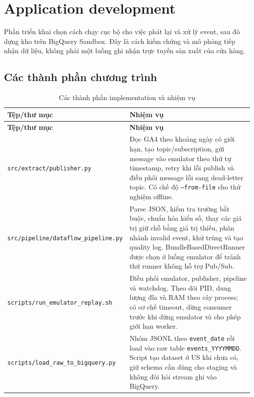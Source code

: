 \section{Application development}
\label{sec:application-development}

Phần triển khai chọn cách chạy cục bộ cho việc phát lại và xử lý event, sau đó dựng kho trên BigQuery Sandbox. Đây là cách kiểm chứng và mô phỏng tiếp nhận dữ liệu, không phải một luồng ghi nhận trực tuyến sản xuất của cửa hàng.

\subsection{Các thành phần chương trình}

\begin{xltabular}{\textwidth}{>{\raggedright\arraybackslash}p{6.3cm} >{\raggedright\arraybackslash}X}
\caption{Các thành phần implementation và nhiệm vụ}
\label{tab:components} \\
\hline
\textbf{Tệp/thư mục} & \textbf{Nhiệm vụ} \\
\hline
\endfirsthead
\hline
\textbf{Tệp/thư mục} & \textbf{Nhiệm vụ} \\
\hline
\endhead
\hline
\endfoot
\hline
\endlastfoot

\texttt{src/extract/publisher.py}
& Đọc GA4 theo khoảng ngày có giới hạn, tạo topic/subscription, gửi message vào emulator theo thứ tự timestamp, retry khi lỗi publish và điều phối message lỗi sang dead-letter topic. Có chế độ \texttt{--from-file} cho thử nghiệm offline. \\

\texttt{src/pipeline/dataflow\_pipeline.py}
& Parse JSON, kiểm tra trường bắt buộc, chuẩn hóa kiểu số, thay các giá trị giữ chỗ bằng giá trị thiếu, phân nhánh invalid event, khử trùng và tạo quality log. BundleBasedDirectRunner được chọn ở luồng emulator để tránh thử runner không hỗ trợ Pub/Sub. \\

\texttt{scripts/run\_emulator\_replay.sh}
& Điều phối emulator, publisher, pipeline và watchdog. Theo dõi PID, dung lượng đĩa và RAM theo cây process; có cơ chế timeout, dừng consumer trước khi dừng emulator và cho phép giới hạn worker. \\

\texttt{scripts/load\_raw\_to\_bigquery.py}
& Nhóm JSONL theo \texttt{event\_date} rồi load vào raw table \texttt{events\_YYYYMMDD}. Script tạo dataset ở US khi chưa có, giữ schema cần dùng cho staging và không đòi hỏi stream ghi vào BigQuery. \\


\end{xltabular}
